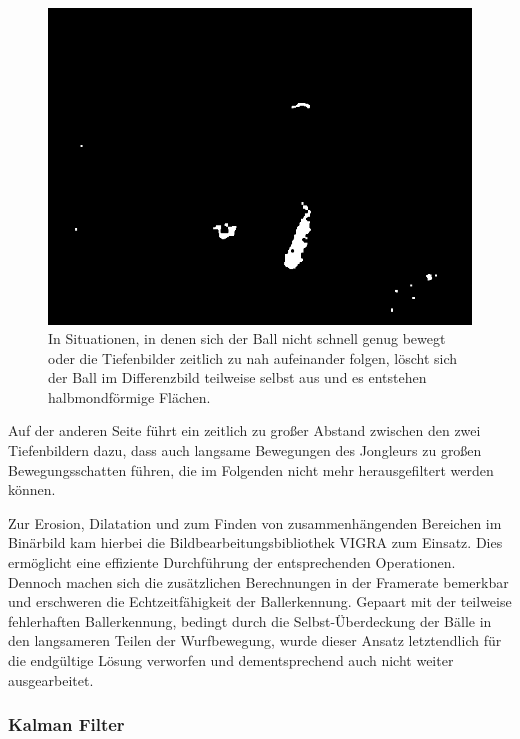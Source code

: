\documentclass[12pt,a4paper,ngerman]{scrartcl}
\begin{document}
\begin{figure}[H]
    \centering
    \includegraphics[scale=0.7]{img/halbmond.png}
    \caption{In Situationen, in denen sich der Ball nicht schnell genug bewegt oder die Tiefenbilder zeitlich zu nah aufeinander folgen, löscht sich der Ball im Differenzbild teilweise selbst aus und es entstehen halbmondförmige Flächen. }
    \label{temporal_halbmond}
\end{figure}

Auf der anderen Seite führt ein zeitlich zu großer Abstand zwischen den zwei Tiefenbildern dazu, dass auch langsame Bewegungen des Jongleurs zu großen Bewegungsschatten führen, die im Folgenden nicht mehr herausgefiltert werden können.

Zur Erosion, Dilatation und zum Finden von zusammenhängenden Bereichen im Binärbild kam hierbei die Bildbearbeitungsbibliothek VIGRA \cite{vigra} zum Einsatz.
Dies ermöglicht eine effiziente Durchführung der entsprechenden Operationen.
Dennoch machen sich die zusätzlichen Berechnungen in der Framerate bemerkbar und erschweren die Echtzeitfähigkeit der Ballerkennung. Gepaart mit der teilweise fehlerhaften Ballerkennung,
bedingt durch die Selbst-Überdeckung der Bälle in den langsameren Teilen der Wurfbewegung, wurde dieser Ansatz letztendlich für die endgültige Lösung verworfen und dementsprechend auch nicht weiter ausgearbeitet.

\subsubsection{Kalman Filter}
\end{document}
